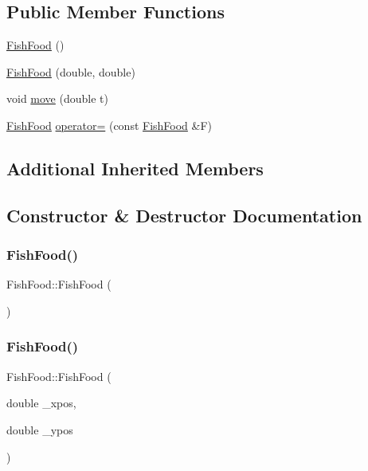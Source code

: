 \subsection*{Public Member Functions}
\begin{DoxyCompactItemize}
\item 
\mbox{\hyperlink{class_fish_food_a9aa0dcd43776eb7b0a98941cec3fbc1c}{Fish\+Food}} ()
\item 
\mbox{\hyperlink{class_fish_food_a3e2ae5b4b6c889595605f66bb9974b98}{Fish\+Food}} (double, double)
\item 
void \mbox{\hyperlink{class_fish_food_ab4dac48078ac8d5d1442c4fc4f4b8971}{move}} (double t)
\item 
\mbox{\hyperlink{class_fish_food}{Fish\+Food}} \mbox{\hyperlink{class_fish_food_aba5ba515f8d473b21ac658ed810e9cd3}{operator=}} (const \mbox{\hyperlink{class_fish_food}{Fish\+Food}} \&F)
\end{DoxyCompactItemize}
\subsection*{Additional Inherited Members}


\subsection{Constructor \& Destructor Documentation}
\mbox{\label{class_fish_food_a9aa0dcd43776eb7b0a98941cec3fbc1c}} 
\subsubsection{\texorpdfstring{Fish\+Food()}{FishFood()}\hspace{0.1cm}{\footnotesize\ttfamily [1/2]}}
{\footnotesize\ttfamily Fish\+Food\+::\+Fish\+Food (\begin{DoxyParamCaption}{ }\end{DoxyParamCaption})}

\mbox{\label{class_fish_food_a3e2ae5b4b6c889595605f66bb9974b98}} 
\subsubsection{\texorpdfstring{Fish\+Food()}{FishFood()}\hspace{0.1cm}{\footnotesize\ttfamily [2/2]}}
{\footnotesize\ttfamily Fish\+Food\+::\+Fish\+Food (\begin{DoxyParamCaption}\item[{double}]{\+\_\+xpos,  }\item[{double}]{\+\_\+ypos }\end{DoxyParamCaption})}



